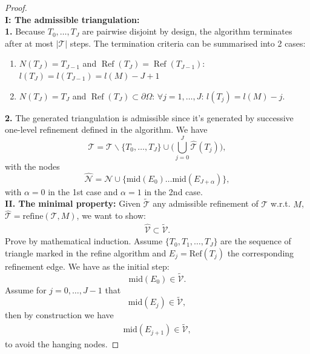 \documentclass[a4paper,12pt,oneside,fleqn]{book}
\theoremstyle{definition}
\theoremstyle{remark}
\DeclareMathOperator*{\refine}{Ref}
\begin{document}
\begin{proof}
\quad\\
\textbf{I: The admissible triangulation:}\\
\textbf{1.} Because $T_0, \dots, T_J$ are pairwise disjoint by design, the algorithm terminates after at most $|\mathcal{T}|$ steps. The termination criteria can be summarised into 2 cases:
\begin{enumerate}
	\item $N(T_{J}) = T_{J-1}$ and $\refine(T_J) = \refine(T_{J -1})$: $l(T_J) = l(T_{J -1}) = l(M) - J + 1 $
	\item $N(T_{J}) = T_J $ and $\refine(T_J) \subset \partial\Omega$: $\forall j = 1, \dots, J$: $l(T_j) = l(M) - j$. 
	\end{enumerate}
\textbf{2.} The generated triangulation is admissible since it's generated by successive one-level refinement defined in the algorithm. We have
\begin{equation*}
	\hat{\mathcal{T}} = \mathcal{T} \backslash \{T_0, \dots, T_J\} \cup\bigg( \bigcup_{j = 0}^J \hat{\mathcal{T}}(T_j)\bigg),
\end{equation*}  
with the nodes
\begin{equation}
	\hat{\mathcal{N}} = \mathcal{N} \cup \{ \text{mid}(E_0) \dots \text{mid}(E_{J + \alpha})\},
\end{equation}
with $\alpha = 0$ in the 1st case and $\alpha = 1$ in the 2nd case. 
\qquad\\
\textbf{II. The minimal property:}
Given $\tilde{\mathcal{T}}$ any admissible refinement of $\mathcal{T}$ w.r.t. $M$, $\hat{\mathcal{T}} = \text{refine}(\mathcal{T}, M)$, we want to show:
\begin{align*}
	\hat{\mathcal{V}}\subset \tilde{\mathcal{V}}. 
\end{align*}  
Prove by mathematical induction. Assume $\{T_0, T_1, \dots, T_J\}$ are the sequence of triangle marked in the refine algorithm and $E_j = \text{Ref}(T_j)$ the corresponding refinement edge. We have as the initial step:
\begin{equation}
	\text{mid}(E_0) \in \tilde{\mathcal{V}}.
\end{equation}
Assume for $j = 0, \dots, J -1$ that
\begin{equation}
	\text{mid}(E_j) \in \tilde{\mathcal{V}},
\end{equation}
then by construction we have
\begin{align*}
	\text{mid}(E_{j + 1}) \in \tilde{\mathcal{V}},
\end{align*}
to avoid the hanging nodes. 
\end{proof}
\end{document}
